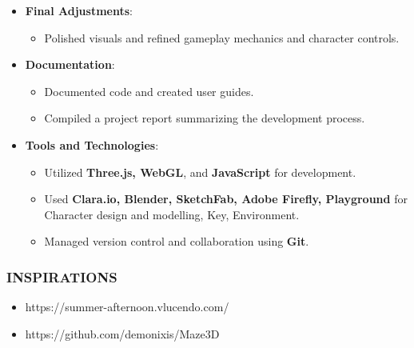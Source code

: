 \documentclass[9pt]{beamer}
\begin{document}
\begin{frame}
    \begin{itemize}
        \item \textbf{Final Adjustments}: 
        \begin{itemize}
            \item Polished visuals and refined gameplay mechanics and character controls.
        \end{itemize}
        \vspace{0.5em}

        \item \textbf{Documentation}: 
        \begin{itemize}
            \item Documented code and created user guides.
            \item Compiled a project report summarizing the development process.
        \end{itemize}
        
        \vspace{0.5em}

        \item \textbf{Tools and Technologies}: 
        \begin{itemize}
            \item Utilized \textbf{Three.js, WebGL}, and \textbf{JavaScript} for development.
            \item Used \textbf{Clara.io, Blender, SketchFab, Adobe Firefly, Playground} for Character design and modelling, Key, Environment.
            \item Managed version control and collaboration using \textbf{Git}.
        \end{itemize}
    \end{itemize}
\end{frame}



\begin{frame}
    \frametitle{INSPIRATIONS}
    \begin{itemize}
        \item https://summer-afternoon.vlucendo.com/
        \item https://github.com/demonixis/Maze3D
    \end{itemize}
\end{frame}
\end{document}
